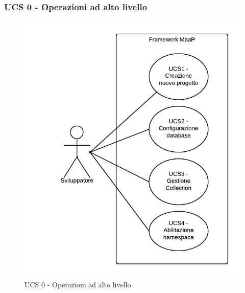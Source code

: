 \subsubsection{UCS 0 - Operazioni ad alto livello} 
    \begin{figure}[H]
      \begin{center}
      \includegraphics[width=12cm]{UML/UCS 0 - Operazioni ad alto livello.png}
      \caption{UCS 0 - Operazioni ad alto livello}
      \end{center} 
    \end{figure}  
    
